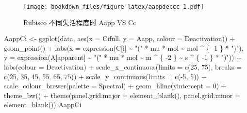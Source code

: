 \documentclass[
]{krantz}
\makeatletter
\newenvironment{Shaded}{\begin{snugshade}}{\end{snugshade}}
\newcommand{\AttributeTok}[1]{\textcolor[rgb]{0.77,0.63,0.00}{#1}}
\newcommand{\DecValTok}[1]{\textcolor[rgb]{0.00,0.00,0.81}{#1}}
\newcommand{\FunctionTok}[1]{\textcolor[rgb]{0.00,0.00,0.00}{#1}}
\newcommand{\NormalTok}[1]{#1}
\newcommand{\OtherTok}[1]{\textcolor[rgb]{0.56,0.35,0.01}{#1}}
\newcommand{\SpecialCharTok}[1]{\textcolor[rgb]{0.00,0.00,0.00}{#1}}
\newcommand{\StringTok}[1]{\textcolor[rgb]{0.31,0.60,0.02}{#1}}
\newenvironment{kframe}{%
\medskip{}
\setlength{\fboxsep}{.8em}
 \def\at@end@of@kframe{}%
 \ifinner\ifhmode%
  \def\at@end@of@kframe{\end{minipage}}%
  \begin{minipage}{\columnwidth}%
 \fi\fi%
 \def\FrameCommand##1{\hskip\@totalleftmargin \hskip-\fboxsep
 \colorbox{shadecolor}{##1}\hskip-\fboxsep
     \hskip-\linewidth \hskip-\@totalleftmargin \hskip\columnwidth}%
 \MakeFramed {\advance\hsize-\width
   \@totalleftmargin\z@ \linewidth\hsize
   \@setminipage}}%
 {\par\unskip\endMakeFramed%
 \at@end@of@kframe}
\renewenvironment{Shaded}{\begin{kframe}}{\end{kframe}}
\makeatother
\begin{document}
\begin{figure}
\centering
\texttt{[image: bookdown\_files/figure-latex/aappdeccc-1.pdf]}
\caption{\label{fig:aappdeccc}Rubisco 不同失活程度时 Aapp VS Cc}
\end{figure}

\begin{Shaded}
\begin{Highlighting}[]
\NormalTok{AappCi }\OtherTok{\textless{}{-}}
  \FunctionTok{ggplot}\NormalTok{(data, }\FunctionTok{aes}\NormalTok{(}\AttributeTok{x =}\NormalTok{ Cifull, }\AttributeTok{y =}\NormalTok{ Aapp, }\AttributeTok{colour =}\NormalTok{ Deactivation)) }\SpecialCharTok{+}
  \FunctionTok{geom\_point}\NormalTok{() }\SpecialCharTok{+}
  \FunctionTok{labs}\NormalTok{(}\AttributeTok{x =} \FunctionTok{expression}\NormalTok{(C[i] }\SpecialCharTok{\textasciitilde{}} \StringTok{"("} \SpecialCharTok{*}\NormalTok{ mu }\SpecialCharTok{*}\NormalTok{ mol }\SpecialCharTok{\textasciitilde{}}\NormalTok{ mol }\SpecialCharTok{\^{}}\NormalTok{ \{}
    \SpecialCharTok{{-}}\DecValTok{1}
\NormalTok{  \} }\SpecialCharTok{*} \StringTok{")"}\NormalTok{),}
  \AttributeTok{y =} \FunctionTok{expression}\NormalTok{(A[apparent] }\SpecialCharTok{\textasciitilde{}} \StringTok{"("} \SpecialCharTok{*}\NormalTok{ mu }\SpecialCharTok{*}\NormalTok{ mol }\SpecialCharTok{\textasciitilde{}}\NormalTok{ m }\SpecialCharTok{\^{}}\NormalTok{ \{}
    \SpecialCharTok{{-}}\DecValTok{2}
\NormalTok{  \} }\SpecialCharTok{\textasciitilde{}}\NormalTok{ s }\SpecialCharTok{\^{}}\NormalTok{ \{}
    \SpecialCharTok{{-}}\DecValTok{1}
\NormalTok{  \} }\SpecialCharTok{*} \StringTok{")"}\NormalTok{)) }\SpecialCharTok{+}
  \FunctionTok{labs}\NormalTok{(}\AttributeTok{colour =} \StringTok{\textquotesingle{}Deactivation\textquotesingle{}}\NormalTok{) }\SpecialCharTok{+}
  \FunctionTok{scale\_x\_continuous}\NormalTok{(}\AttributeTok{limits =} \FunctionTok{c}\NormalTok{(}\DecValTok{25}\NormalTok{, }\DecValTok{75}\NormalTok{),}
                     \AttributeTok{breaks =} \FunctionTok{c}\NormalTok{(}\DecValTok{25}\NormalTok{, }\DecValTok{35}\NormalTok{, }\DecValTok{45}\NormalTok{, }\DecValTok{55}\NormalTok{, }\DecValTok{65}\NormalTok{, }\DecValTok{75}\NormalTok{)) }\SpecialCharTok{+}
  \FunctionTok{scale\_y\_continuous}\NormalTok{(}\AttributeTok{limits =} \FunctionTok{c}\NormalTok{(}\SpecialCharTok{{-}}\DecValTok{5}\NormalTok{, }\DecValTok{5}\NormalTok{)) }\SpecialCharTok{+}
  \FunctionTok{scale\_colour\_brewer}\NormalTok{(}\AttributeTok{palette =} \StringTok{\textquotesingle{}Spectral\textquotesingle{}}\NormalTok{) }\SpecialCharTok{+}
  \FunctionTok{geom\_hline}\NormalTok{(}\AttributeTok{yintercept =} \DecValTok{0}\NormalTok{) }\SpecialCharTok{+}
  \FunctionTok{theme\_bw}\NormalTok{() }\SpecialCharTok{+}
  \FunctionTok{theme}\NormalTok{(}\AttributeTok{panel.grid.major =} \FunctionTok{element\_blank}\NormalTok{(),}
        \AttributeTok{panel.grid.minor =} \FunctionTok{element\_blank}\NormalTok{())}
\NormalTok{AappCi}
\end{Highlighting}
\end{Shaded}
\end{document}
